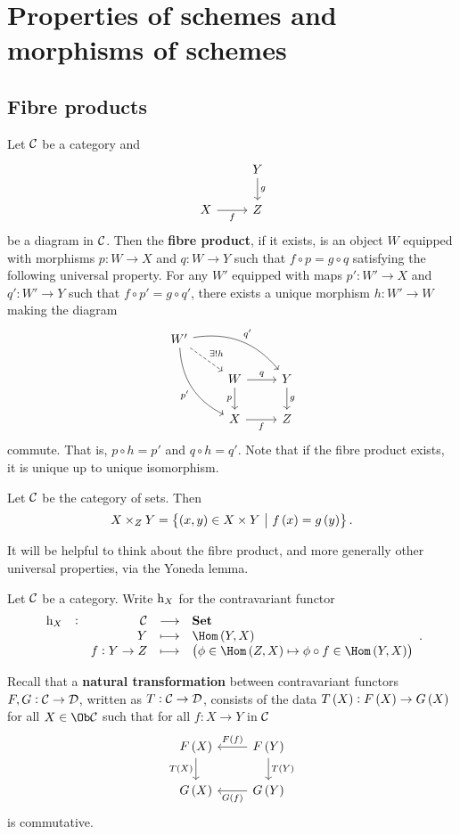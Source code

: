 \pagebreak

\section{Properties of schemes and morphisms of schemes}

\subsection{Fibre products}

Let $ \mathcal{C} $ be a category and
$$
\begin{tikzcd}
& Y \arrow{d}{g} \\
X \arrow{r}[swap]{f} & Z
\end{tikzcd}
$$
be a diagram in $ \mathcal{C} $. Then the \textbf{fibre product}, if it exists, is an object $ W $ equipped with morphisms $ p : W \to X $ and $ q : W \to Y $ such that $ f \circ p = g \circ q $ satisfying the following universal property. For any $ W' $ equipped with maps $ p' : W' \to X $ and $ q' : W' \to Y $ such that $ f \circ p' = g \circ q' $, there exists a unique morphism $ h : W' \to W $ making the diagram
$$
\begin{tikzcd}
W' \arrow[dashed]{dr}{\exists !h} \arrow[bend left=30]{drr}{q'} \arrow[bend right=30]{ddr}[swap]{p'} & & \\
& W \arrow{r}{q} \arrow{d}[swap]{p} & Y \arrow{d}{g} \\
& X \arrow{r}[swap]{f} & Z
\end{tikzcd}
$$
commute. That is, $ p \circ h = p' $ and $ q \circ h = q' $. Note that if the fibre product exists, it is unique up to unique isomorphism.

\begin{example*}
Let $ \mathcal{C} $ be the category of sets. Then
$$ X \times_Z Y = \cbr{\br{x, y} \in X \times Y \st f\br{x} = g\br{y}}. $$
\end{example*}

It will be helpful to think about the fibre product, and more generally other universal properties, via the Yoneda lemma.

\begin{definition*}
Let $ \mathcal{C} $ be a category. Write $ \mathrm{h}_X $ for the contravariant functor
$$ \functions[\h_X]{\CCC}{\Set}{Y}{\Hom\br{Y, X}}{f : Y \to Z}{\br{\phi \in \Hom\br{Z, X} \mapsto \phi \circ f \in \Hom\br{Y, X}}}. $$
\end{definition*}

Recall that a \textbf{natural transformation} between contravariant functors $ F, G : \mathcal{C} \to \mathcal{D} $, written as $ T : \mathcal{C} \to \mathcal{D} $, consists of the data $ T\br{X} : F\br{X} \to G\br{X} $ for all $ X \in \Ob \CCC $ such that for all $ f : X \to Y $ in $ \mathcal{C} $
$$
\begin{tikzcd}
F\br{X} \arrow{d}[swap]{T\br{X}} & F\br{Y} \arrow{l}[swap]{F\br{f}} \arrow{d}{T\br{Y}} \\
G\br{X} & G\br{Y} \arrow{l}{G\br{f}}
\end{tikzcd}
$$
is commutative.


